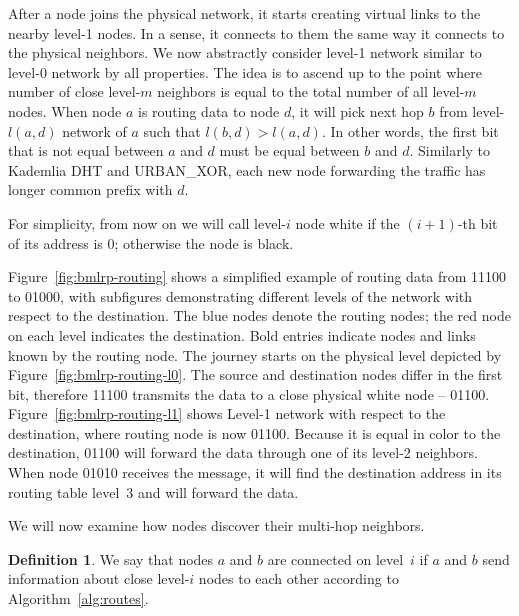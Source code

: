\documentclass[14pt]{extarticle}
\theoremstyle{definition}
\newtheorem{defn}{Definition}
\newcommand{\urbanxor}{URBAN\_XOR}
\begin{document}
After a node joins the physical network, it starts creating virtual links to the nearby level-1 nodes. In a sense, it connects to them the same way it connects to the physical neighbors. We now abstractly consider level-1 network similar to level-0 network by all properties. The idea is to ascend up to the point where number of close level-$m$ neighbors is equal to the total number of all level-$m$ nodes. When node $a$ is routing data to node $d$, it will pick next hop $b$ from level-$l(a,d)$ network of $a$ such that $l(b,d) > l(a,d)$. In other words, the first bit that is not equal between $a$ and $d$ must be equal between $b$ and $d$. Similarly to Kademlia DHT and \urbanxor, each new node forwarding the traffic has longer common prefix with $d$.

For simplicity, from now on we will call level-$i$ node white if the $(i+1)$-th bit of its address is 0; otherwise the node is black.

Figure~\ref{fig:bmlrp-routing} shows a simplified example of routing data from 11100 to 01000, with subfigures demonstrating different levels of the network with respect to the destination. The blue nodes denote the routing nodes; the red node on each level indicates the destination. Bold entries indicate nodes and links known by the routing node. The journey starts on the physical level depicted by Figure~\ref{fig:bmlrp-routing-l0}. The source and destination nodes differ in the first bit, therefore 11100 transmits the data to a close physical white node -- 01100. Figure~\ref{fig:bmlrp-routing-l1} shows Level-1 network with respect to the destination, where routing node is now 01100. Because it is equal in color to the destination, 01100 will forward the data through one of its level-2 neighbors. When node 01010 receives the message, it will find the destination address in its routing table level~3 and will forward the data.



We will now examine how nodes discover their multi-hop neighbors.

\begin{defn}
    We say that nodes $a$ and $b$ are connected on level~$i$ if $a$ and $b$ send information about close level-$i$ nodes to each other according to Algorithm~\ref{alg:routes}.
    
    \label{defn:connected}
\end{defn}
\end{document}
